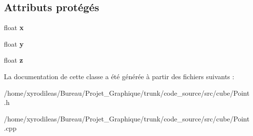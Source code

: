 \subsection*{Attributs protégés}
\begin{DoxyCompactItemize}
\item 
\hypertarget{classPoint_a05dfe2dfbde813ad234b514f30e662f1}{float {\bfseries x}}\label{classPoint_a05dfe2dfbde813ad234b514f30e662f1}

\item 
\hypertarget{classPoint_a6101960c8d2d4e8ea1d32c9234bbeb8d}{float {\bfseries y}}\label{classPoint_a6101960c8d2d4e8ea1d32c9234bbeb8d}

\item 
\hypertarget{classPoint_a9a666531e0e99adff132be93d2407d0c}{float {\bfseries z}}\label{classPoint_a9a666531e0e99adff132be93d2407d0c}

\end{DoxyCompactItemize}


La documentation de cette classe a été générée à partir des fichiers suivants \-:\begin{DoxyCompactItemize}
\item 
/home/xyrodileas/\-Bureau/\-Projet\-\_\-\-Graphique/trunk/code\-\_\-source/src/cube/Point.\-h\item 
/home/xyrodileas/\-Bureau/\-Projet\-\_\-\-Graphique/trunk/code\-\_\-source/src/cube/Point.\-cpp\end{DoxyCompactItemize}
